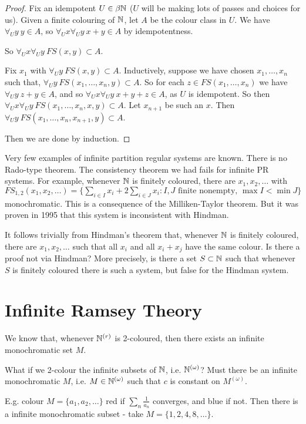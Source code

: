 \documentclass[10pt,a4paper]{article}
\begin{document}
\begin{proof}
  Fix an idempotent $U \in \beta \mathbb{N}$ ($U$ will be making lots of passes and choices for us). Given a finite colouring of $\mathbb{N}$, let $A$ be the colour class in $U$. We have $\forall_U y\: y \in A$, so $\forall_U x \forall_U y\: x+y \in A$ by idempotentness.

  So $\forall_U x \forall_U y\:FS(x,y) \subset A$.

  Fix $x_1$ with $\forall_U y\:FS(x,y) \subset A$. Inductively, suppose we have chosen $x_1, \ldots, x_n$ such that, $\forall_U y\:FS(x_1, \ldots, x_n, y) \subset A$. So for each $z \in FS(x_1, \ldots, x_n)$ we have $\forall_U y\:z+y \in A$, and so $\forall_Ux \forall_U y\:x+y+z \in A$, as $U$ is idempotent. So then $\forall_U x \forall_U y\:FS(x_1, \ldots, x_n, x,y) \subset A$. Let $x_{n+1}$ be such an $x$. Then $\forall_U y\:FS(x_1, \ldots, x_n, x_{n+1}, y) \subset A$.

  Then we are done by induction.
\end{proof}
Very few examples of infinite partition regular systems are known. There is no Rado-type theorem. The consistency theorem we had fails for infinite PR systems. For example, whenever $\mathbb{N}$ is finitely coloured, there are $x_1, x_2, \ldots$ with $FS_{1,2}(x_1, x_2, \ldots) = \{\sum_{ i \in I}x_i  + 2 \sum_{ i \in J}x_i : I, J \text{ finite nonempty, }\max I < \min J\}$ monochromatic. This is a consequence of the Milliken-Taylor theorem. But it was proven in 1995 that this system is inconsistent with Hindman.

It follows trivially from Hindman's theorem that, whenever $\mathbb{N}$ is finitely coloured, there are $x_1, x_2, \ldots$ such that all $x_i$ and all $x_i+x_j$ have the same colour. Is there a proof not via Hindman? More precisely, is there a set $S \subset \mathbb{N}$ such that whenever $S$ is finitely coloured there is such a system, but false for the Hindman system.

\section{Infinite Ramsey Theory}
We know that, whenever $\mathbb{N}^{(r)}$ is 2-coloured, then there exists an infinite monochromatic set $M$.

What if we 2-colour the infinite subsets of $\mathbb{N}$, i.e. $\mathbb{N}^{(\omega)}$? Must there be an infinite monochromatic $M$, i.e. $M \in \mathbb{N}^{(\omega)}$ such that $c$ is constant on $M^{(\omega)}$.

E.g. colour $M = \{a_1, a_2, \ldots\}$ red if $\sum_{n}\frac{1}{a_n}$ converges, and blue if not. Then there is a infinite monochromatic subset - take $M = \{1, 2, 4, 8, \ldots\}$.
\end{document}
